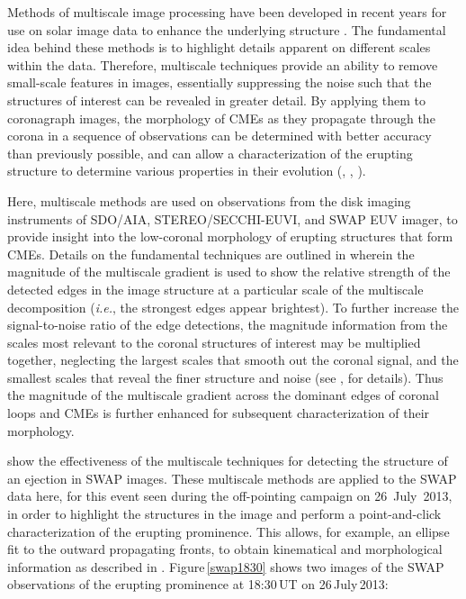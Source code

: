 \documentclass[namedreferences]{solarphysics}
\begin{document}
\begin{article}
Methods of multiscale image processing have been developed in recent years for use on solar image data to enhance the underlying structure \cite{2008ApJ...674.1201S,2008SoPh..248..457Y,2011AdSpR..47.2118G,2014SoPh..289.2945M}. The fundamental idea behind these methods is to highlight details apparent on different scales within the data. Therefore, multiscale techniques provide an ability to remove small-scale features in images, essentially suppressing the noise such that the structures of interest can be revealed in greater detail. By applying them to coronagraph images, the morphology of CMEs as they propagate through the corona in a sequence of observations can be determined with better accuracy than previously possible, and can allow a characterization of the erupting structure to determine various properties in their evolution (, \citeyear{2010NatCo...1E..74B}, \citeyear{2012ApJ...752..145B}). 

Here, multiscale methods are used on observations from the disk imaging instruments of SDO/AIA, STEREO/SECCHI-EUVI, and SWAP EUV imager, to provide insight into the low-coronal morphology of erupting structures that form CMEs. Details on the fundamental techniques are outlined in  wherein the magnitude of the multiscale gradient is used to show the relative strength of the detected edges in the image structure at a particular scale of the multiscale decomposition (\emph{i.e.}, the strongest edges appear brightest). To further increase the signal-to-noise ratio of the edge detections, the magnitude information from the scales most relevant to the coronal structures of interest may be multiplied together, neglecting the largest scales that smooth out the coronal signal, and the smallest scales that reveal the finer structure and noise (see , for details). Thus the magnitude of the multiscale gradient across the dominant edges of coronal loops and CMEs is further enhanced for subsequent characterization of their morphology. 

 show the effectiveness of the multiscale techniques for detecting the structure of an ejection in SWAP images. These multiscale methods are applied to the SWAP data here, for this event seen during the off-pointing campaign on 26~July~2013, in order to highlight the structures in the image and perform a point-and-click characterization of the erupting prominence. This allows, for example, an ellipse fit to the outward propagating fronts, to obtain kinematical and morphological information as described in . Figure\,\ref{swap1830} shows two images of the SWAP observations of the erupting prominence at 18:30\,UT on 26\,July\,2013:




\end{article}
\end{document}
